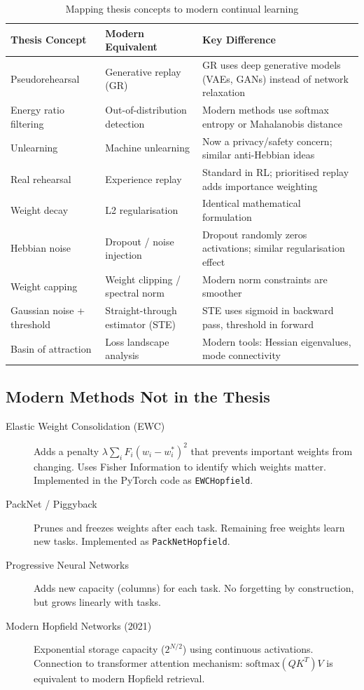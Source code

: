 \documentclass[11pt,a4paper]{article}
\begin{document}
\begin{table}[h]
\centering\small
\begin{tabular}{p{4cm}p{4cm}p{5cm}}
\toprule
\textbf{Thesis Concept} & \textbf{Modern Equivalent} & \textbf{Key Difference} \\
\midrule
Pseudorehearsal & Generative replay (GR)\newline \cite{atkinson2018pseudo} & GR uses deep generative models (VAEs, GANs) instead of network relaxation \\
Energy ratio filtering & Out-of-distribution detection & Modern methods use softmax entropy or Mahalanobis distance \\
Unlearning & Machine unlearning & Now a privacy/safety concern; similar anti-Hebbian ideas \\
Real rehearsal & Experience replay & Standard in RL; prioritised replay adds importance weighting \\
Weight decay & L2 regularisation & Identical mathematical formulation \\
Hebbian noise & Dropout / noise injection & Dropout randomly zeros activations; similar regularisation effect \\
Weight capping & Weight clipping / spectral norm & Modern norm constraints are smoother \\
Gaussian noise + threshold & Straight-through estimator (STE) & STE uses sigmoid in backward pass, threshold in forward \\
Basin of attraction & Loss landscape analysis & Modern tools: Hessian eigenvalues, mode connectivity \\
\bottomrule
\end{tabular}
\caption{Mapping thesis concepts to modern continual learning}
\end{table}

\subsection{Modern Methods Not in the Thesis}

\begin{description}
    \item[Elastic Weight Consolidation (EWC)] Adds a penalty $\lambda \sum_i F_i(w_i - w_i^*)^2$ that prevents important weights from changing. Uses Fisher Information to identify which weights matter. Implemented in the PyTorch code as \texttt{EWCHopfield}.

    \item[PackNet / Piggyback] Prunes and freezes weights after each task. Remaining free weights learn new tasks. Implemented as \texttt{PackNetHopfield}.

    \item[Progressive Neural Networks] Adds new capacity (columns) for each task. No forgetting by construction, but grows linearly with tasks.

    \item[Modern Hopfield Networks (2021)] Exponential storage capacity ($2^{N/2}$) using continuous activations. Connection to transformer attention mechanism: $\text{softmax}(QK^T)V$ is equivalent to modern Hopfield retrieval.
\end{description}
\end{document}
